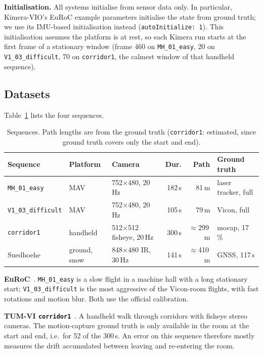 \documentclass[conference,a4paper]{IEEEtran}
\newcommand{\ds}[1]{\texttt{#1}}
\newcommand{\MHe}{\ds{MH\_01\_easy}}
\newcommand{\VId}{\ds{V1\_03\_difficult}}
\newcommand{\corr}{\ds{corridor1}}
\newcommand{\sued}{Suedhoehe}
\begin{document}
\textbf{Initialisation.} All systems initialise from sensor data only. In particular,
Kimera-VIO's EuRoC example parameters initialise the state from ground truth; we use its
IMU-based initialisation instead (\texttt{autoInitialize: 1}). This initialisation assumes the
platform is at rest, so each Kimera run starts at the first frame of a stationary window
(frame 460 on \MHe{}, 20 on \VId{}, 70 on \corr{}, the calmest window of that handheld
sequence).

\subsection{Datasets}

Table~\ref{tab:datasets} lists the four sequences.

\begin{table}[t]
\centering
\caption{Sequences. Path lengths are from the ground truth (\corr: estimated, since ground truth
covers only the start and end).}
\label{tab:datasets}
\setlength{\tabcolsep}{3pt}
\footnotesize
\begin{tabular}{@{}lllrrl@{}}
\toprule
Sequence & Platform & Camera & Dur. & Path & Ground truth \\
\midrule
\MHe{} & MAV & 752$\times$480, 20\,Hz & 182\,s & 81\,m & laser tracker, full \\
\VId{} & MAV & 752$\times$480, 20\,Hz & 105\,s & 79\,m & Vicon, full \\
\corr{} & handheld & 512$\times$512 fisheye, 20\,Hz & 300\,s & $\approx$299\,m & mocap, 17\,\% \\
\sued{} & ground, snow & 848$\times$480 IR, 30\,Hz & 141\,s & $\approx$410\,m & GNSS, 117\,s \\
\bottomrule
\end{tabular}
\end{table}

\textbf{EuRoC}~\cite{euroc}. \MHe{} is a slow flight in a machine hall with a long stationary
start; \VId{} is the most aggressive of the Vicon-room flights, with fast rotations and motion
blur. Both use the official calibration.

\textbf{TUM-VI \corr{}}~\cite{schubert2018tumvi}. A handheld walk through corridors with
fisheye stereo cameras. The motion-capture ground truth is only available in the room at the
start and end, i.e.\ for 52 of the 300\,s. An error on this sequence therefore mostly measures
the drift accumulated between leaving and re-entering the room.
\end{document}
